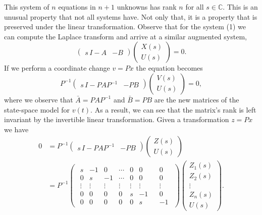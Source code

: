 This system of \(n\) equations in \(n+1\) unknowns has rank \(n\) for all \(s\in \mathbb{C}.\)
This is an unusual property that not all systems have.
Not only that, it is a property that is preserved under the linear transformation.
Observe that for the system (1) we can compute the Laplace transform and arrive at a similar augmented system,
\[
  \left(
  \begin{array}{l|l}
    s\, I - A & -B
  \end{array}
  \right)
  \begin{pmatrix}
    X(s) \\ U(s)
  \end{pmatrix}
  =
  0.
\]
If we perform a coordinate change \(v = P x\) the equation becomes
\[
  P^{-1}
  \left(
  \begin{array}{l|l}
    s\, I - P A P^{-1} & -P B
  \end{array}
  \right)
  \begin{pmatrix}
    V(s) \\ U(s)
  \end{pmatrix}
  =
  0,
\]
where we observe that \(\bar{A} = P A P^{-1}\) and \(\bar{B} = P B\) are the new matrices of the state-space model for \(v(t).\)
As a result, we can see that the matrix's rank is left invariant by the invertible linear transformation.
Given a transformation \(z = P x\) we have
\[\begin{aligned}
  0
    &=
      P^{-1}
      \left(
      \begin{array}{l|l}
        s\, I - P A P^{-1} & -P B
      \end{array}
      \right)
      \begin{pmatrix}
        Z(s) \\ U(s)
      \end{pmatrix}\\
    &=
      P^{-1}
      \left(
      \begin{array}{l|l}
        \begin{array}{cccccc}
          s      & -1     & 0      & \cdots & 0      & 0\\
          0      &  s     & -1     & \cdots & 0      & 0\\
          \vdots & \vdots & \vdots & \vdots & \vdots & \vdots\\
          0      &  0     & 0      & 0      & s      & -1\\
          0      &  0     & 0      & 0      & 0      & s
        \end{array}
        &
        \begin{array}{c} 0 \\ 0 \\ \vdots \\ 0 \\ -1 \end{array}
      \end{array}
      \right)
      \begin{pmatrix}
        Z_1(s)\\
        Z_2(s)\\
        \vdots\\
        Z_n(s)\\
        U(s)
      \end{pmatrix}.
\end{aligned}\]
